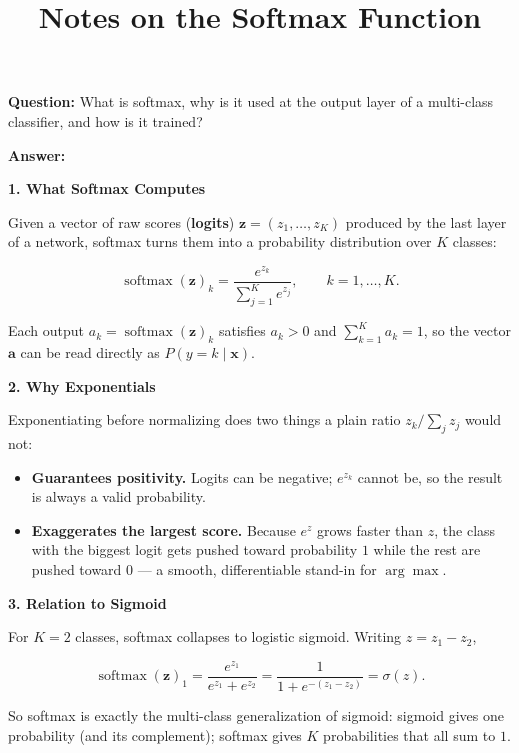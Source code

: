 \documentclass[conference]{IEEEtran}
\title{Notes on the Softmax Function}
\author{
\IEEEauthorblockN{Luis Mendez}
}
\begin{document}
\maketitle

\textbf{Question:} What is softmax, why is it used at the output layer of
a multi-class classifier, and how is it trained?

\bigskip

\textbf{Answer:}

\bigskip

\textbf{1. What Softmax Computes}

Given a vector of raw scores (\textbf{logits}) $\mathbf{z} =
(z_1,\dots,z_K)$ produced by the last layer of a network, softmax turns
them into a probability distribution over $K$ classes:

\[
  \operatorname{softmax}(\mathbf{z})_k = \frac{e^{z_k}}{\sum_{j=1}^{K} e^{z_j}},
  \qquad k = 1,\dots,K.
\]

Each output $a_k = \operatorname{softmax}(\mathbf{z})_k$ satisfies $a_k >
0$ and $\sum_{k=1}^K a_k = 1$, so the vector $\mathbf{a}$ can be read
directly as $P(y=k \mid \mathbf{x})$.

\bigskip

\textbf{2. Why Exponentials}

Exponentiating before normalizing does two things a plain ratio
$z_k/\sum_j z_j$ would not:

\begin{itemize}
    \item \textbf{Guarantees positivity.} Logits can be negative; $e^{z_k}$
          cannot be, so the result is always a valid probability.
    \item \textbf{Exaggerates the largest score.} Because $e^{z}$ grows
          faster than $z$, the class with the biggest logit gets pushed
          toward probability $1$ while the rest are pushed toward $0$ ---
          a smooth, differentiable stand-in for $\arg\max$.
\end{itemize}

\bigskip

\textbf{3. Relation to Sigmoid}

For $K=2$ classes, softmax collapses to logistic sigmoid. Writing
$z = z_1 - z_2$,

\[
  \operatorname{softmax}(\mathbf{z})_1
  = \frac{e^{z_1}}{e^{z_1}+e^{z_2}}
  = \frac{1}{1+e^{-(z_1-z_2)}}
  = \sigma(z).
\]

So softmax is exactly the multi-class generalization of sigmoid: sigmoid
gives one probability (and its complement); softmax gives $K$
probabilities that all sum to $1$.
\end{document}
